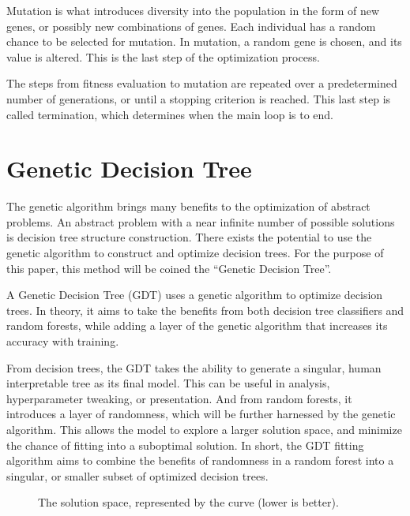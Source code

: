 \documentclass[12pt]{article}
\begin{document}
Mutation is what introduces diversity into the population in the form of new genes, or possibly new combinations of genes. Each individual has a random chance to be selected for mutation. In mutation, a random gene is chosen, and its value is altered. This is the last step of the optimization process.

The steps from fitness evaluation to mutation are repeated over a predetermined number of generations, or until a stopping criterion is reached. This last step is called termination, which determines when the main loop is to end.

\section{Genetic Decision Tree}

The genetic algorithm brings many benefits to the optimization of abstract problems. An abstract problem with a near infinite number of possible solutions is decision tree structure construction. There exists the potential to use the genetic algorithm to construct and optimize decision trees. For the purpose of this paper, this method will be coined the ``Genetic Decision Tree''.

A Genetic Decision Tree (GDT) uses a genetic algorithm to optimize decision trees. In theory, it aims to take the benefits from both decision tree classifiers and random forests, while adding a layer of the genetic algorithm that increases its accuracy with training.

From decision trees, the GDT takes the ability to generate a singular, human interpretable tree as its final model. This can be useful in analysis, hyperparameter tweaking, or presentation. And from random forests, it introduces a layer of randomness, which will be further harnessed by the genetic algorithm. This allows the model to explore a larger solution space, and minimize the chance of fitting into a suboptimal solution. In short, the GDT fitting algorithm aims to combine the benefits of randomness in a random forest into a singular, or smaller subset of optimized decision trees.

\begin{figure}[H]
    \centering
    \caption{The solution space, represented by the curve (lower is better).}
    \label{fig:solutionspace}
\end{figure}
\end{document}
